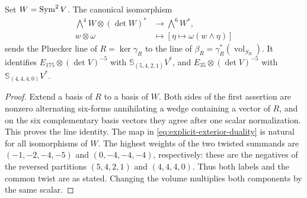 \begin{lemma}
\label{lem:readout-exterior-twist}
Set \(W=\operatorname{Sym}^2V\).  The canonical isomorphism
\begin{equation}\label{eq:explicit-exterior-duality}
 \begin{split}
 \bigwedge^4W\otimes(\det W)^*&\longrightarrow\bigwedge^6W^*,\\
 w\otimes\omega&\longmapsto[\eta\mapsto\omega(w\wedge\eta)]
 \end{split}
\end{equation}
sends the Pluecker line of \(R=\ker\gamma_R\) to the line of
\(\beta_R=\gamma_R^*(\operatorname{vol}_{S_R})\).
It identifies \(E_{175}\otimes(\det V)^{-5}\) with
\(\mathbb S_{(5,4,2,1)}V^*\), and
\(E_{35}\otimes(\det V)^{-5}\) with
\(\mathbb S_{(4,4,4,0)}V^*\).
\end{lemma}
\begin{proof}
Extend a basis of \(R\) to a basis of \(W\).  Both sides of the
first assertion are nonzero alternating six-forms annihilating a
wedge containing a vector of \(R\), and on the six complementary
basis vectors they agree after one scalar normalization.  This proves
the line identity.  The map in \eqref{eq:explicit-exterior-duality}
is natural for all isomorphisms of \(W\).
The highest weights of the two twisted summands are
\((-1,-2,-4,-5)\) and \((0,-4,-4,-4)\), respectively: these are
the negatives of the reversed partitions \((5,4,2,1)\) and
\((4,4,4,0)\).  Thus both labels and the common twist are as stated.
Changing the volume multiplies both components by the same scalar.
\end{proof}
